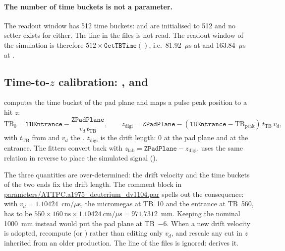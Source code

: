 \paragraph{The number of time buckets is not a parameter.} The readout window has 512 time buckets:
 and  are initialised to 512 and no setter exists for
either. The  line in the  files is not read. The readout window of the
simulation is therefore $512\times\mathtt{GetTBTime()}$, i.e.\ 81.92~$\mu$s at
 and 163.84~$\mu$s at .

\subsection{Time-to-$z$ calibration: ,  and }
\label{sec:par-zcal}

 computes the time bucket of the pad plane and  maps a pulse
peak position to a hit $z$:
\begin{equation*}
  \mathrm{TB}_0 = \mathtt{TBEntrance} - \frac{\mathtt{ZPadPlane}}{v_d\,t_\mathrm{TB}},\qquad
  z_\mathrm{digi} = \mathtt{ZPadPlane} - (\mathtt{TBEntrance} - \mathrm{TB}_\mathrm{peak})\,
  t_\mathrm{TB}\,v_d ,
\end{equation*}
with $t_\mathrm{TB}$ from  and $v_d$ the .
$z_\mathrm{digi}$ is the drift length: 0 at the pad plane and  at the entrance. The
fitters convert back with $z_\mathrm{lab} = \mathtt{ZPadPlane} - z_\mathrm{digi}$.
 uses the same relation in reverse to place the simulated signal
().

The three quantities are over-determined: the drift velocity and the time buckets of the two ends fix
the drift length. The comment block in \url{parameters/ATTPC.a1975_deuterium_dv1104.par} spells out
the consequence: with $v_d = 1.10424$~cm/$\mu$s, the micromegas at TB~10 and the entrance at TB~560,
 has to be $550 \times 160~\mathrm{ns} \times 1.10424~\mathrm{cm}/\mu\mathrm{s}
= 971.7312$~mm. Keeping the nominal 1000~mm instead would put the pad plane at TB~$-6$. When a new
drift velocity is adopted, recompute  (or ) rather than editing only
$v_d$, and rescale any cut in $z$ inherited from an older production. The  line of the
 files is ignored:  derives it.

